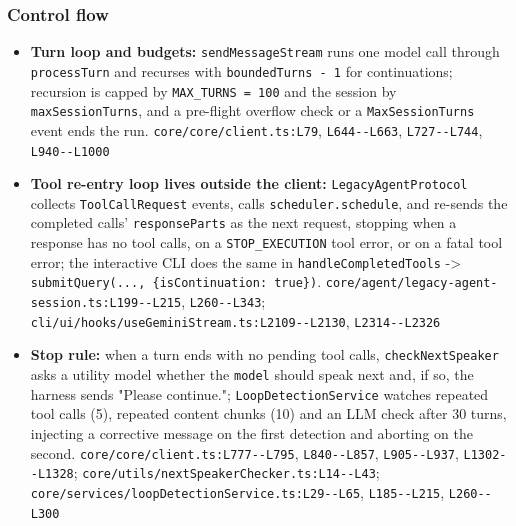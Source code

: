 \subsubsection*{Control flow}
\begin{itemize}
\item \textbf{Turn loop and budgets:} \texttt{sendMessageStream} runs one model call through \texttt{processTurn} and recurses with \texttt{boundedTurns -\allowbreak{} 1} for continuations; recursion is capped by \texttt{MAX\_\allowbreak{}TURNS = 100} and the session by \texttt{maxSessionTurns}, and a pre-flight overflow check or a \texttt{MaxSessionTurns} event ends the run. \texttt{core/\allowbreak{}core/\allowbreak{}client.\allowbreak{}ts:\allowbreak{}L79}, \texttt{L644-\allowbreak{}-\allowbreak{}L663}, \texttt{L727-\allowbreak{}-\allowbreak{}L744}, \texttt{L940-\allowbreak{}-\allowbreak{}L1000}
\item \textbf{Tool re-entry loop lives outside the client:} \texttt{LegacyAgentProtocol} collects \texttt{ToolCallRequest} events, calls \texttt{scheduler.\allowbreak{}schedule}, and re-sends the completed calls' \texttt{responseParts} as the next request, stopping when a response has no tool calls, on a \texttt{STOP\_\allowbreak{}EXECUTION} tool error, or on a fatal tool error; the interactive CLI does the same in \texttt{handleCompletedTools} -> \texttt{submitQuery(\allowbreak{}.\allowbreak{}.\allowbreak{}.\allowbreak{}, \{isContinuation:\allowbreak{} true\})}. \texttt{core/\allowbreak{}agent/\allowbreak{}legacy-\allowbreak{}agent-\allowbreak{}session.\allowbreak{}ts:\allowbreak{}L199-\allowbreak{}-\allowbreak{}L215}, \texttt{L260-\allowbreak{}-\allowbreak{}L343}; \texttt{cli/\allowbreak{}ui/\allowbreak{}hooks/\allowbreak{}useGeminiStream.\allowbreak{}ts:\allowbreak{}L2109-\allowbreak{}-\allowbreak{}L2130}, \texttt{L2314-\allowbreak{}-\allowbreak{}L2326}
\item \textbf{Stop rule:} when a turn ends with no pending tool calls, \texttt{checkNextSpeaker} asks a utility model whether the \texttt{model} should speak next and, if so, the harness sends "Please continue."; \texttt{LoopDetectionService} watches repeated tool calls (5), repeated content chunks (10) and an LLM check after 30 turns, injecting a corrective message on the first detection and aborting on the second. \texttt{core/\allowbreak{}core/\allowbreak{}client.\allowbreak{}ts:\allowbreak{}L777-\allowbreak{}-\allowbreak{}L795}, \texttt{L840-\allowbreak{}-\allowbreak{}L857}, \texttt{L905-\allowbreak{}-\allowbreak{}L937}, \texttt{L1302-\allowbreak{}-\allowbreak{}L1328}; \texttt{core/\allowbreak{}utils/\allowbreak{}nextSpeakerChecker.\allowbreak{}ts:\allowbreak{}L14-\allowbreak{}-\allowbreak{}L43}; \texttt{core/\allowbreak{}services/\allowbreak{}loopDetectionService.\allowbreak{}ts:\allowbreak{}L29-\allowbreak{}-\allowbreak{}L65}, \texttt{L185-\allowbreak{}-\allowbreak{}L215}, \texttt{L260-\allowbreak{}-\allowbreak{}L300}

\end{itemize}
